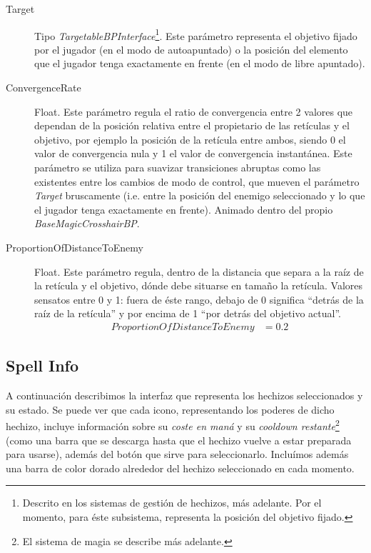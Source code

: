 \documentclass[12pt]{report}
\begin{document}
\begin{description}
	\item[Target] Tipo \textit{\emph{TargetableBPInterface}}\footnote{Descrito en los sistemas de gestión de hechizos, más adelante. Por el momento, para éste subsistema, representa la posición del objetivo fijado.}. Este parámetro representa el objetivo fijado por el jugador (en el modo de autoapuntado) o la posición del elemento que el jugador tenga exactamente en frente (en el modo de libre apuntado).
	\item[ConvergenceRate] Float. Este parámetro regula el ratio de convergencia entre 2 valores que dependan de la posición relativa entre el propietario de las retículas y el objetivo, por ejemplo la posición de la retícula entre ambos, siendo 0 el valor de convergencia nula y 1 el valor de convergencia instantánea. Este parámetro se utiliza para suavizar transiciones abruptas como las existentes entre los cambios de modo de control, que mueven el parámetro \textit{Target} bruscamente (i.e. entre la posición del enemigo seleccionado y lo que el jugador tenga exactamente en frente). Animado dentro del propio \textit{\emph{BaseMagicCrosshairBP}}.
	\item[ProportionOfDistanceToEnemy] Float. Este parámetro regula, dentro de la distancia que separa a la raíz de la retícula y el objetivo, dónde debe situarse en tamaño la retícula. Valores sensatos entre 0 y 1: fuera de éste rango, debajo de 0 significa ``detrás de la raíz de la retícula'' y por encima de 1 ``por detrás del objetivo actual''.
    \begin{align}
		ProportionOfDistanceToEnemy &= 0.2
   	\end{align}
\end{description}

\subsection{Spell Info}

A continuación describimos la interfaz que representa los hechizos seleccionados y su estado. Se puede ver que cada icono, representando los poderes de dicho hechizo, incluye información sobre su \textit{coste en maná} y su \textit{cooldown restante}\footnote{El sistema de magia se describe más adelante.} (como una barra que se descarga hasta que el hechizo vuelve a estar preparada para usarse), además del botón que sirve para seleccionarlo. Incluímos además una barra de color dorado alrededor del hechizo seleccionado en cada momento. 
\end{document}
